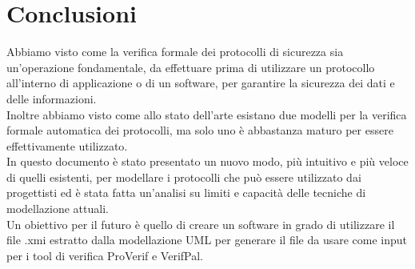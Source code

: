 \section{Conclusioni}
Abbiamo visto come la verifica formale dei protocolli di sicurezza sia un'operazione fondamentale, da effettuare prima di utilizzare un protocollo all'interno di applicazione o di un software, per garantire la sicurezza dei dati e delle informazioni.\\
Inoltre abbiamo visto come allo stato dell'arte esistano due modelli per la verifica formale automatica dei protocolli, ma solo uno è abbastanza maturo per essere effettivamente utilizzato.\\
In questo documento è stato presentato un nuovo modo, più intuitivo e più veloce di quelli esistenti, per modellare i protocolli che può essere utilizzato dai progettisti ed è stata fatta un'analisi su limiti e capacità delle tecniche di modellazione attuali. \\
Un obiettivo per il futuro è quello di creare un software in grado di utilizzare il file .xmi estratto dalla modellazione UML per generare il file da usare come input per i tool di verifica ProVerif e VerifPal.